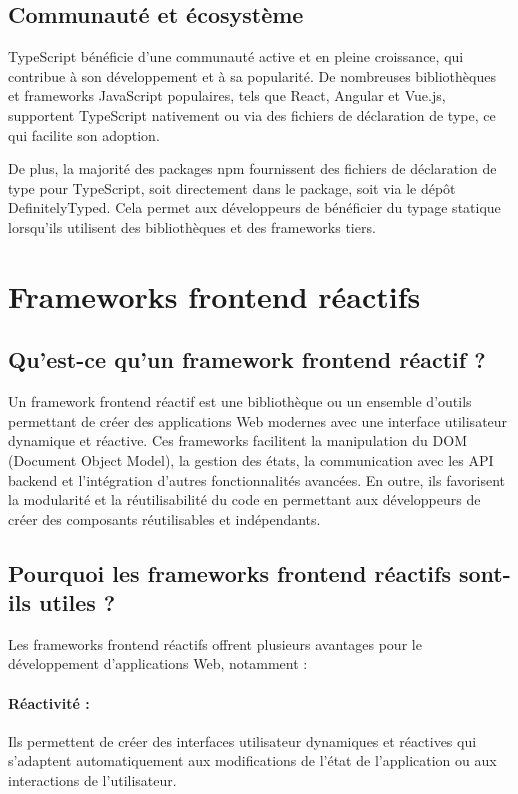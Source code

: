 \subsection{Communauté et écosystème}

TypeScript bénéficie d'une communauté active et en pleine croissance, qui contribue à son développement et à sa popularité. De nombreuses bibliothèques et frameworks JavaScript populaires, tels que React, Angular et Vue.js, supportent TypeScript nativement ou via des fichiers de déclaration de type, ce qui facilite son adoption.

De plus, la majorité des packages npm fournissent des fichiers de déclaration de type pour TypeScript, soit directement dans le package, soit via le dépôt DefinitelyTyped. Cela permet aux développeurs de bénéficier du typage statique lorsqu'ils utilisent des bibliothèques et des frameworks tiers.

\section{Frameworks frontend réactifs}

\subsection{Qu'est-ce qu'un framework frontend réactif ?}

Un framework frontend réactif est une bibliothèque ou un ensemble d'outils permettant de créer des applications Web modernes avec une interface utilisateur dynamique et réactive. Ces frameworks facilitent la manipulation du \Gls{DOM} (Document Object Model), la gestion des états, la communication avec les API backend et l'intégration d'autres fonctionnalités avancées. En outre, ils favorisent la modularité et la réutilisabilité du code en permettant aux développeurs de créer des composants réutilisables et indépendants.

\subsection{Pourquoi les frameworks frontend réactifs sont-ils utiles ?}

Les frameworks frontend réactifs offrent plusieurs avantages pour le développement d'applications Web, notamment :

\paragraph{Réactivité :} Ils permettent de créer des interfaces utilisateur dynamiques et réactives qui s'adaptent automatiquement aux modifications de l'état de l'application ou aux interactions de l'utilisateur.
